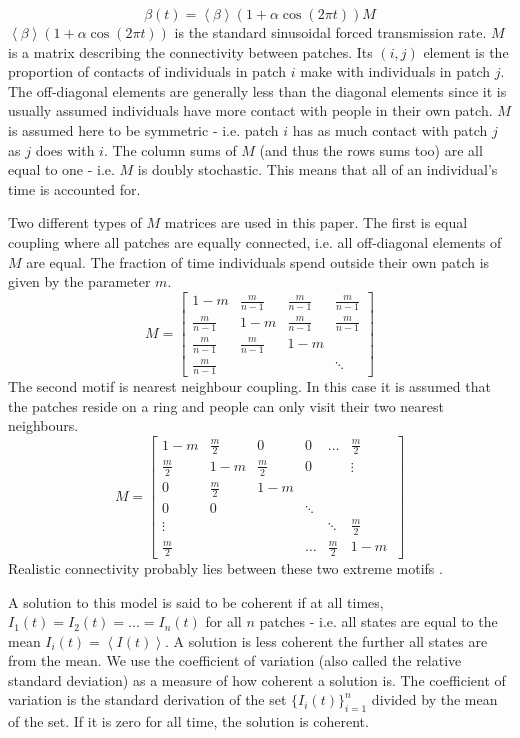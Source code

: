 \documentclass[twocolumn,nofootinbib,showkeys,twoside,floatfix,unsortedaddress,flushbottom,10pt,aps,pra]{report}
\begin{document}
\begin{equation}
  \beta(t) = \left < \beta \right > (1+\alpha \cos(2\pi t))M
\end{equation}
$\left < \beta \right > (1+\alpha \cos(2\pi t))$ is the standard sinusoidal forced transmission rate. $M$ is a matrix describing the connectivity between patches. Its $(i,j)$ element is the proportion of contacts of individuals in patch $i$ make with individuals in patch $j$. The off-diagonal elements are generally less than the diagonal elements since it is usually assumed individuals have more contact with people in their own patch. $M$ is assumed here to be symmetric - i.e. patch $i$ has as much contact with patch $j$ as $j$ does with $i$. The column sums of $M$ (and thus the rows sums too) are all equal to one - i.e. $M$ is doubly stochastic. This means that all of an individual's time is accounted for. 
\par \smallskip \qquad
Two different types of $M$ matrices are used in this paper. The first is equal coupling where all patches are equally connected, i.e. all off-diagonal elements of $M$ are equal. The fraction of time individuals spend outside their own patch is given by the parameter $m$.
\[
M =
\begin{bmatrix}
  1-m & \frac{m}{n-1} & \frac{m}{n-1} & \frac{m}{n-1} \\
  \frac{m}{n-1} & 1-m & \frac{m}{n-1} & \frac{m}{n-1}  \\
  \frac{m}{n-1} & \frac{m}{n-1} & 1-m &  \\
  \frac{m}{n-1} &  &  & \ddots 
\end{bmatrix}
\]
The second motif is nearest neighbour coupling. In this case it is assumed that the patches reside on a ring and people can only visit their two nearest neighbours.
\[
M =
\begin{bmatrix}
  1-m & \frac{m}{2} & 0 & 0 & \dots & \frac{m}{2} \\
  \frac{m}{2} & 1-m & \frac{m}{2} & 0 & & \vdots \\
  0 & \frac{m}{2} & 1-m &  \\
  0 & 0 & & \ddots \\
  \vdots & & & & \ddots & \frac{m}{2} \\
  \frac{m}{2} &  & & \dots & \frac{m}{2} & 1-m \ 
\end{bmatrix}
\]
Realistic connectivity probably lies between these two extreme motifs \cite{Earn2000}.\par
 \smallskip \qquad
 A solution to this model is said to be coherent if at all times, $I_1(t)=I_2(t)=...=I_n(t)$ for all $n$ patches \cite{McCluskey2011} - i.e. all states are equal to the mean $I_i(t)=\left < I(t) \right > $. A solution is less coherent the further all states are from the mean. We use the coefficient of variation (also called the relative standard deviation) as a measure of how coherent a solution is. The coefficient of variation is the standard derivation of the set $\{I_i(t)\}_{i=1}^n$ divided by the mean of the set. If it is zero for all time, the solution is coherent.
\end{document}
